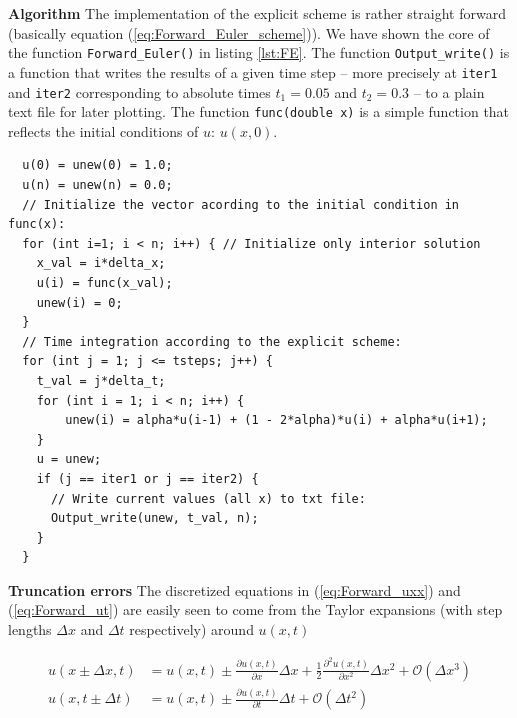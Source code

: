 \documentclass[a4paper, 11pt, notitlepage,english]{article}
\begin{document}
\textbf{Algorithm} \newline
The implementation of the explicit scheme is rather straight forward (basically equation (\ref{eq:Forward_Euler_scheme})). We have shown the core of the function \texttt{Forward\_Euler()} in listing \ref{lst:FE}. The function \texttt{Output\_write()} is a function that writes the results of a given time step – more precisely at \texttt{iter1} and \texttt{iter2} corresponding to absolute times $t_1 = 0.05$ and $t_2 = 0.3$ – to a plain text file for later plotting. The function \texttt{func(double x)} is a simple function that reflects the initial conditions of $u$: $u(x,0)$.

\begin{center}
\begin{lstlisting}
  u(0) = unew(0) = 1.0;
  u(n) = unew(n) = 0.0;
  // Initialize the vector acording to the initial condition in func(x):
  for (int i=1; i < n; i++) { // Initialize only interior solution
  	x_val = i*delta_x;
  	u(i) = func(x_val);
  	unew(i) = 0;
  }
  // Time integration according to the explicit scheme:
  for (int j = 1; j <= tsteps; j++) {
  	t_val = j*delta_t;
  	for (int i = 1; i < n; i++) {
  		unew(i) = alpha*u(i-1) + (1 - 2*alpha)*u(i) + alpha*u(i+1);
  	}
  	u = unew;
  	if (j == iter1 or j == iter2) {
  	  // Write current values (all x) to txt file:
  	  Output_write(unew, t_val, n);
    }
  }
\end{lstlisting}
\end{center}

\textbf{Truncation errors} \newline
The discretized equations in (\ref{eq:Forward_uxx}) and (\ref{eq:Forward_ut}) are easily seen to come from the Taylor expansions (with step lengths $\Delta x$ and $\Delta t$ respectively) around $u(x,t)$ 

\begin{align}
u(x\pm\Delta x,t) &= u(x,t) \pm \frac{\partial u(x,t)}{\partial x}\Delta x + \frac{1}{2}\frac{\partial^2 u(x,t)}{\partial x^2}\Delta x^2 + \mathcal{O}(\Delta x^3)
\label{eq:Forward_Euler_expansions1} \\
u(x,t\pm \Delta t) &= u(x,t) \pm \frac{\partial u(x,t)}{\partial t}\Delta t + \mathcal{O}(\Delta t^2)
\label{eq:Forward_Euler_expansions2}
\end{align}
\end{document}
